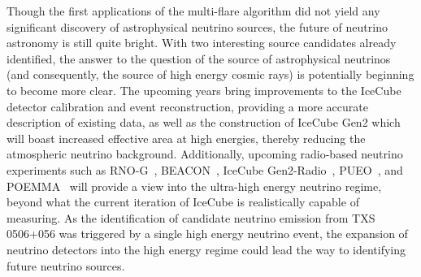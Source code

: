 Though the first applications of the multi-flare algorithm did not yield any significant discovery of astrophysical neutrino sources, the future of neutrino astronomy is still quite bright. With two interesting source candidates already identified, the answer to the question of the source of astrophysical neutrinos (and consequently, the source of high energy cosmic rays) is potentially beginning to become more clear. The upcoming years bring improvements to the IceCube detector calibration and event reconstruction, providing a more accurate description of existing data, as well as the construction of IceCube Gen2 which will boast increased effective area at high energies, thereby reducing the atmospheric neutrino background. Additionally, upcoming radio-based neutrino experiments such as RNO-G~\cite{RONG_design}, BEACON~\cite{Wissel_2020}, IceCube Gen2-Radio~\cite{Gen2paper}, PUEO~\cite{abarr2021payload}, and POEMMA~\cite{olinto2021poemma} will provide a view into the ultra-high energy neutrino regime, beyond what the current iteration of IceCube is realistically capable of measuring. As the identification of candidate neutrino emission from TXS 0506+056 was triggered by a single high energy neutrino event, the expansion of neutrino detectors into the high energy regime could lead the way to identifying future neutrino sources. 


